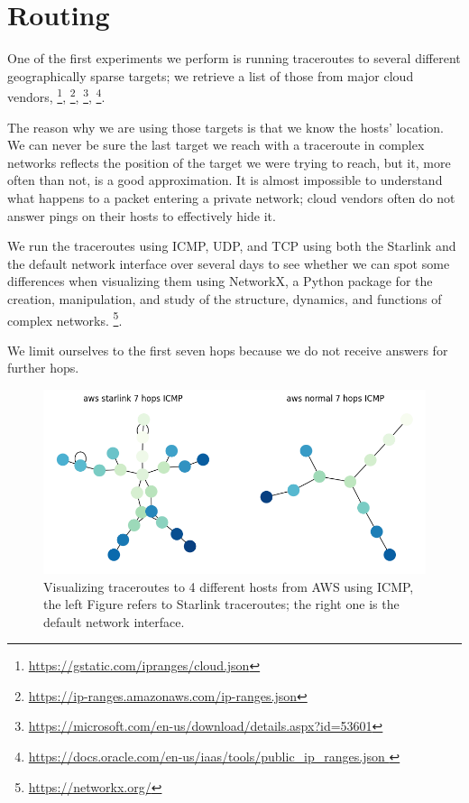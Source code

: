 \documentclass[IN,11pt,twoside,openright,idp,english]{tumthesis}
\begin{document}
\section{Routing}
    
One of the first experiments we perform is running traceroutes to several different geographically sparse targets; we retrieve a list of those from major cloud vendors, \footnote{\url{ https://gstatic.com/ipranges/cloud.json}}, \footnote{\url{https://ip-ranges.amazonaws.com/ip-ranges.json}}, \footnote{\url{https://microsoft.com/en-us/download/details.aspx?id=53601}}, \footnote{\url{https://docs.oracle.com/en-us/iaas/tools/public_ip_ranges.json }}.
    
The reason why we are using those targets is that we know the hosts' location. We can never be sure the last target we reach with a traceroute in complex networks reflects the position of the target we were trying to reach, but it, more often than not, is a good approximation. 
It is almost impossible to understand what happens to a packet entering a private network; cloud vendors often do not answer pings on their hosts to effectively hide it. 
    
We run the traceroutes using ICMP, UDP, and TCP using both the Starlink and the default network interface over several days to see whether we can spot some differences when visualizing them using NetworkX, a Python package for the creation, manipulation, and study of the structure, dynamics, and functions of complex networks. \footnote{\url{https://networkx.org/}}. 

We limit ourselves to the first seven hops because we do not receive answers for further hops. 
    
\begin{figure}
    \label{fig:tr_aws_icmp}
    \centering
    \includegraphics[width=0.6\columnwidth]{img/tr_aws_icmp.png}
    \caption{Visualizing traceroutes to 4 different hosts from AWS using ICMP, the left Figure refers to Starlink traceroutes; the right one is the default network interface.}
\end{figure}
    
\end{document}
